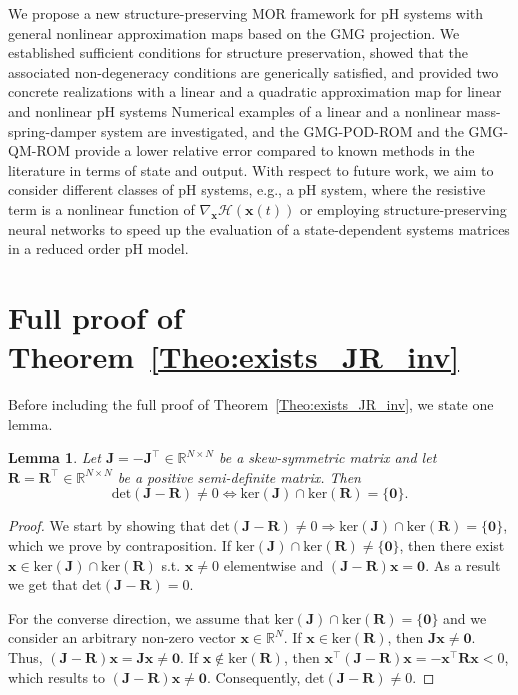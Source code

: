 \documentclass{article}
\newtheorem{lemma}[theorem]{Lemma}
\newcommand{\bmJ}{\bm{J}}
\newcommand{\bmR}{\bm{R}}
\newcommand{\R}{\mathbb{R}}
\newcommand{\curlyH}{\mathcal{H}}
\newcommand{\DivHamFOM}{\nabla_{\statex}\curlyH(\statex(t))}
\newcommand{\statex}{{\bm x}}
\newcommand{\bzero}{\mathbf{0}}
\newcommand{\FOMsize}{N}
\newcommand{\pH}{\textsf{pH}\xspace}
\newcommand{\GMG}{\textsf{GMG}\xspace}
\newcommand{\QM}{\textsf{QM}\xspace} %
\newcommand{\POD}{\textsf{POD}\xspace}
\newcommand{\ROM}{\textsf{ROM}\xspace}
\newcommand{\MOR}{\textsf{MOR}\xspace}
\newcommand{\framework}{framework \xspace}
\begin{document}
We propose a new structure-preserving \MOR \framework for \pH systems with general nonlinear approximation maps based on the \GMG projection. 
We established sufficient conditions for structure preservation, showed that the associated non-degeneracy conditions are generically satisfied, and provided two concrete realizations with a linear and a quadratic approximation map for linear and nonlinear \pH systems
Numerical examples of a linear and a nonlinear mass-spring-damper system are investigated, and the \GMG-\POD-\ROM and the \GMG-\QM-\ROM provide a lower relative error compared to known methods in the literature in terms of state and output. 
With respect to future work, we aim to consider different classes of \pH systems, e.g., a \pH system, where the resistive term is a nonlinear function of $\DivHamFOM$ or employing structure-preserving neural networks to speed up the evaluation of a state-dependent systems matrices in a reduced order \pH model.  
	
\appendix 
\section{Full proof of Theorem~\ref{Theo:exists_JR_inv}} \label{sec_app_proofs}

Before including the full proof of Theorem~\ref{Theo:exists_JR_inv}, we state one lemma.
	\begin{lemma}
		\label{lemma:ker_JR}
		Let $\bmJ=-\bmJ^{\top}\in\R^{\FOMsize\times \FOMsize}$ be a skew-symmetric matrix and let $\bmR=\bmR^{\top}\in\R^{\FOMsize\times\FOMsize}$ be a positive semi-definite matrix. Then
		\begin{equation*}
			\mathrm{det}\left(\bmJ-\bmR\right)\neq 0 
			\Leftrightarrow
			\mathrm{ker}\left(\bmJ\right)\cap \mathrm{ker}\left(\bmR\right)=\{\bzero\}.
		\end{equation*} 
	\end{lemma}
	\begin{proof}
	We start by showing that $\mathrm{det}\left(\bmJ-\bmR\right)\neq 0 
		\Rightarrow
		\mathrm{ker}\left(\bmJ\right)\cap \mathrm{ker}\left(\bmR\right)=\{\bzero\}$, which we prove by contraposition. 
	If $\mathrm{ker}\left(\bmJ\right)\cap \mathrm{ker}\left(\bmR\right)\neq\{\bzero\}$, then there exist $\statex\in\mathrm{ker}\left(\bmJ\right)\cap \mathrm{ker}\left(\bmR\right)$ s.t. $\statex\neq 0$ elementwise and 
			$(\bmJ-\bmR)\statex =\bzero$. As a result we get that $\mathrm{det}\left(\bmJ-\bmR\right)= 0$. 
			
			For the converse direction, we assume that $\mathrm{ker}\left(\bmJ\right)\cap \mathrm{ker}\left(\bmR\right)=\{\bzero\}$ and we consider an arbitrary non-zero vector $\statex\in\R^{\FOMsize}$. 
			If $\statex\in\mathrm{ker}(\bmR)$, then $\bmJ\statex\neq\bzero$. Thus, $(\bmJ-\bmR)\statex 
			=\bmJ\statex
			\neq\bzero$. If $\statex\notin\mathrm{ker}(\bmR)$, then $\statex^{\top}(\bmJ-\bmR)\statex = -\statex^{\top}\bmR\statex < 0$, which results to $(\bmJ-\bmR)\statex \neq\bzero$.
			Consequently,  $\mathrm{det}\left(\bmJ-\bmR\right)\neq 0 $.

	\end{proof}
\end{document}
